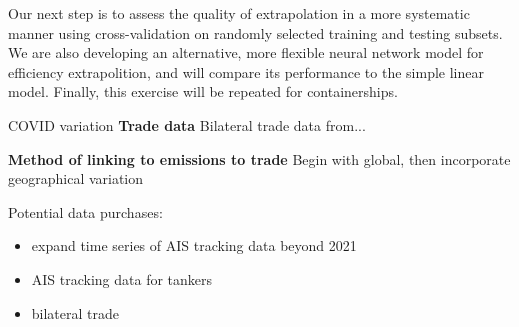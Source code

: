 \documentclass[hidelinks, 12pt,letterpaper]{article}
\begin{document}
Our next step is to assess the quality of extrapolation in a more systematic manner using cross-validation on randomly selected training and testing subsets. We are also developing an alternative, more flexible neural network model for efficiency extrapolition, and will compare its performance to the simple linear model. Finally, this exercise will be repeated for containerships.

COVID variation
\textbf{Trade data} Bilateral trade data from...

\textbf{Method of linking to emissions to trade}
Begin with global, then incorporate geographical variation


\pagebreak
Potential data purchases:
\begin{itemize}
  \item expand time series of AIS tracking data beyond 2021
  \item AIS tracking data for tankers
  \item bilateral trade
\end{itemize}

\pagebreak

\singlespace{

}
\end{document}
